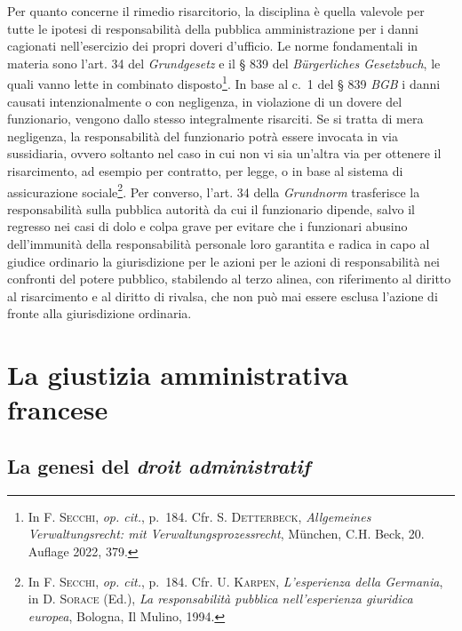 \documentclass[12pt,it,a4paper,]{report}
\begin{document}
Per quanto concerne il rimedio risarcitorio, la disciplina è quella
valevole per tutte le ipotesi di responsabilità della pubblica
amministrazione per i danni cagionati nell'esercizio dei propri doveri
d'ufficio. Le norme fondamentali in materia sono l'art. 34 del
\emph{Grundgesetz} e il § 839 del \emph{Bürgerliches Gesetzbuch}, le
quali vanno lette in combinato disposto\footnote{In \textsc{F. Secchi},
  \emph{op. cit.}, p.~184. Cfr. S. \textsc{Detterbeck},
  \emph{Allgemeines Verwaltungsrecht: mit Verwaltungsprozessrecht},
  München, C.H. Beck, 20. Auflage 2022, 379.}. In base al c.~1 del § 839
\emph{BGB} i danni causati intenzionalmente o con negligenza, in
violazione di un dovere del funzionario, vengono dallo stesso
integralmente risarciti. Se si tratta di mera negligenza, la
responsabilità del funzionario potrà essere invocata in via sussidiaria,
ovvero soltanto nel caso in cui non vi sia un'altra via per ottenere il
risarcimento, ad esempio per contratto, per legge, o in base al sistema
di assicurazione sociale\footnote{In \textsc{F. Secchi}, \emph{op.
  cit.}, p.~184. Cfr. U. \textsc{Karpen}, \emph{L'esperienza della
  Germania}, in D. \textsc{Sorace} (Ed.), \emph{La responsabilità
  pubblica nell'esperienza giuridica europea}, Bologna, Il Mulino, 1994.}.
Per converso, l'art. 34 della \emph{Grundnorm} trasferisce la
responsabilità sulla pubblica autorità da cui il funzionario dipende,
salvo il regresso nei casi di dolo e colpa grave per evitare che i
funzionari abusino dell'immunità della responsabilità personale loro
garantita e radica in capo al giudice ordinario la giurisdizione per le
azioni per le azioni di responsabilità nei confronti del potere
pubblico, stabilendo al terzo alinea, con riferimento al diritto al
risarcimento e al diritto di rivalsa, che non può mai essere esclusa
l'azione di fronte alla giurisdizione ordinaria.

\hypertarget{la-giustizia-amministrativa-francese}{%
\chapter{La giustizia amministrativa
francese}\label{la-giustizia-amministrativa-francese}}

\hypertarget{la-genesi-del-droit-administratif}{%
\section{\texorpdfstring{La genesi del \emph{droit
administratif}}{La genesi del droit administratif}}\label{la-genesi-del-droit-administratif}}
\end{document}
